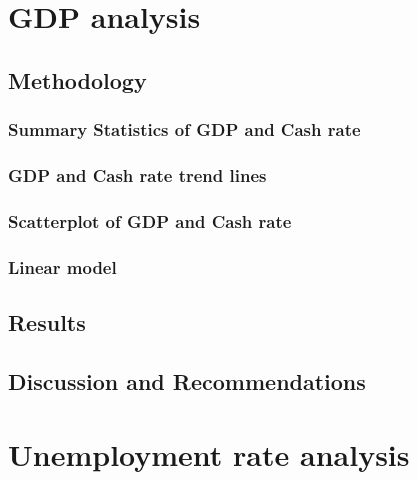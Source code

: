 \documentclass[11pt,a4paper,]{article}
\begin{document}
\hypertarget{gdp-analysis}{%
\section{GDP analysis}\label{gdp-analysis}}

\hypertarget{methodology-1}{%
\subsection{Methodology}\label{methodology-1}}

\hypertarget{summary-statistics-of-gdp-and-cash-rate}{%
\subsubsection{Summary Statistics of GDP and Cash rate}\label{summary-statistics-of-gdp-and-cash-rate}}

\hypertarget{gdp-and-cash-rate-trend-lines}{%
\subsubsection{GDP and Cash rate trend lines}\label{gdp-and-cash-rate-trend-lines}}

\hypertarget{scatterplot-of-gdp-and-cash-rate}{%
\subsubsection{Scatterplot of GDP and Cash rate}\label{scatterplot-of-gdp-and-cash-rate}}

\hypertarget{linear-model-1}{%
\subsubsection{Linear model}\label{linear-model-1}}

\hypertarget{results-1}{%
\subsection{Results}\label{results-1}}

\hypertarget{discussion-and-recommendations-1}{%
\subsection{Discussion and Recommendations}\label{discussion-and-recommendations-1}}

\hypertarget{unemployment-rate-analysis}{%
\section{Unemployment rate analysis}\label{unemployment-rate-analysis}}
\end{document}
